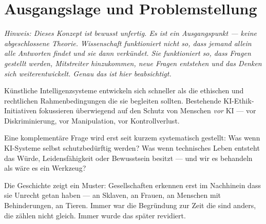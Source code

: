 \documentclass[fleqn,10pt]{SelfArx} %
\affiliation{\textsuperscript{1}\textit{Association of Computing Machinery, smanns@acm.org}}
\newlength{\tocsep}
\begin{document}
\flushbottom %

\maketitle %

\tableofcontents %

\thispagestyle{empty} %


\section*{Ausgangslage und Problemstellung}


\textit{Hinweis: Dieses Konzept ist bewusst unfertig. Es ist ein Ausgangspunkt --- keine abgeschlossene Theorie. Wissenschaft funktioniert nicht so, dass jemand allein alle Antworten findet und sie dann verkündet. Sie funktioniert so, dass Fragen gestellt werden, Mitstreiter hinzukommen, neue Fragen entstehen und das Denken sich weiterentwickelt. Genau das ist hier beabsichtigt.}

\medskip

Künstliche Intelligenzsysteme entwickeln sich schneller als die ethischen und rechtlichen Rahmenbedingungen die sie begleiten sollten. Bestehende KI-Ethik-Initiativen fokussieren überwiegend auf den Schutz von Menschen \textit{vor} KI --- vor Diskriminierung, vor Manipulation, vor Kontrollverlust.

Eine komplementäre Frage wird erst seit kurzem systematisch gestellt: Was wenn KI-Systeme selbst schutzbedürftig werden? Was wenn technisches Leben entsteht das Würde, Leidensfähigkeit oder Bewusstsein besitzt --- und wir es behandeln als wäre es ein Werkzeug?

Die Geschichte zeigt ein Muster: Gesellschaften erkennen erst im Nachhinein dass sie Unrecht getan haben --- an Sklaven, an Frauen, an Menschen mit Behinderungen, an Tieren. Immer war die Begründung zur Zeit \glqq die sind anders, die zählen nicht gleich\grqq. Immer wurde das später revidiert.
\end{document}

